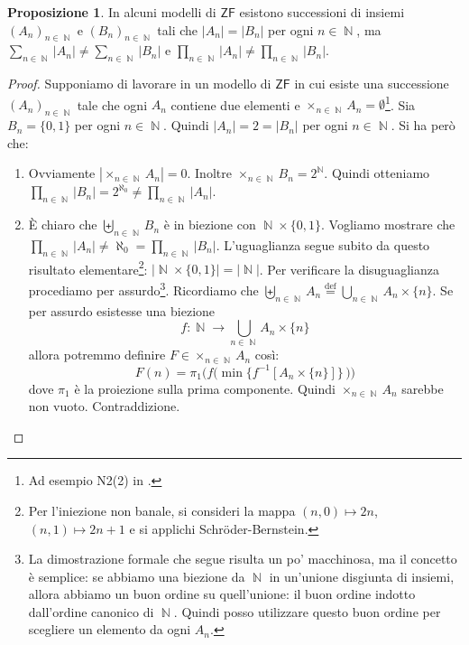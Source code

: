 \documentclass[12pt,a4paper]{report}
\theoremstyle{definition}
\newtheorem{prop}[teo]{Proposizione}  %
\theoremstyle{num.custom-title}
\DeclareMathOperator{\N}{\mathbb{N}}
\newcommand{\ZF}{\ensuremath{\mathsf{ZF}}\xspace}
\begin{document}
\begin{prop}
In alcuni modelli di \ZF esistono successioni di insiemi $(A_n)_{n \in \N}$ e $(B_n)_{n \in \N}$ tali che $|A_n|=|B_n|$ per ogni $n \in \N$, ma $\displaystyle\sum_{n \in \N} |A_n| \neq \displaystyle\sum_{n \in \N} |B_n|$ e $\displaystyle\prod_{n \in \N} |A_n| \neq \displaystyle\prod_{n \in \N} |B_n|$.
\begin{proof}
Supponiamo di lavorare in un modello di \ZF in cui esiste una successione $(A_n)_{n \in \N}$ tale che ogni $A_n$ contiene due elementi e $\times_{n \in \N} A_n = \emptyset$\footnote{Ad esempio N2(2) in \cite{HoRu98:Herrlich}.}. Sia $B_n=\{0,1\}$ per ogni $n \in \N$. Quindi $|A_n|=2=|B_n|$ per ogni $n \in \N$. Si ha però che:
\begin{enumerate}
\item Ovviamente $|\!\times_{n \in \N} A_n| = 0$. Inoltre $\times_{n \in \N} B_n = 2^{\N}$. Quindi otteniamo\\ $\displaystyle\prod_{n \in \N} |B_n| = 2^{\aleph_0} \neq \displaystyle\prod_{n \in \N} |A_n|$.
\item È chiaro che $\displaystyle\biguplus_{n \in \N} B_n$ è in biezione con $\N \times \{0,1\}$. Vogliamo mostrare che $\displaystyle\prod_{n \in \N} |A_n| \neq \aleph_0 = \displaystyle\prod_{n \in \N} |B_n|$. L'uguaglianza segue subito da questo risultato elementare\footnote{Per l'iniezione non banale, si consideri la mappa $(n,0) \mapsto 2n$, $(n,1) \mapsto 2n+1$ e si applichi Schröder-Bernstein.}: $|\N \times \{0,1\}|=|\N|$. Per verificare la disuguaglianza procediamo per assurdo\footnote{La dimostrazione formale che segue risulta un po' macchinosa, ma il concetto è semplice: se abbiamo una biezione da $\N$ in un'unione disgiunta di insiemi, allora abbiamo un buon ordine su quell'unione: il buon ordine indotto dall'ordine canonico di $\N$. Quindi posso utilizzare questo buon ordine per scegliere un elemento da ogni $A_n$.}. Ricordiamo che $\displaystyle\biguplus_{n \in \N} A_n \stackrel{\text{def}}{=} \displaystyle\bigcup_{n \in \N} A_n \times \{n\}$. Se per assurdo esistesse una biezione 
\[
f: \N \to \displaystyle\bigcup_{n \in \N} A_n \times \{n\}
\]
allora potremmo definire $F \in \times_{n \in \N} A_n$ così:
\[
F(n)= \pi_1\Big(f\big(\min \big\{f^{-1}[A_n \times \{n\}] \big\} \, \big)\Big)
\]
dove $\pi_1$ è la proiezione sulla prima componente. Quindi $\times_{n \in \N} A_n$ sarebbe non vuoto. Contraddizione.
\end{enumerate}
\end{proof}
\end{prop}
\end{document}
